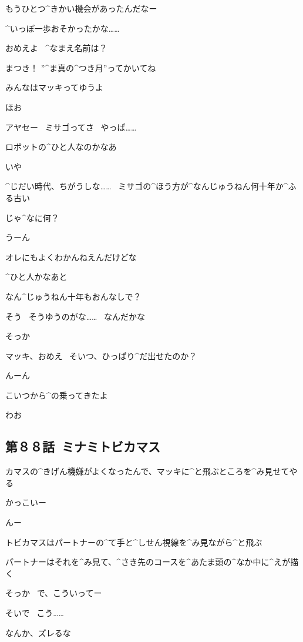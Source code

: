 \Ayase もうひとつ^{きかい}{機会}があったんだなー

\Ayase ^{いっぽ}{一歩}おそかったかな……

\page
\Ayase おめえよ
\ ^{なまえ}{名前}は？

\Makki まつき！
”^{ま}{真}の^{つき}{月}”ってかいてね

\Makki みんなはマッキってゆうよ

\Ayase ほお

\Makki アヤセー
\ ミサゴってさ
\ やっぱ……

\Makki ロボットの^{ひと}{人}なのかなあ

\Ayase いや

\Ayase ^{じだい}{時代}、ちがうしな……
\ ミサゴの^{ほう}{方}が^{なんじゅうねん}{何十年}か^{ふる}{古}い

\page
\Makki じゃ^{なに}{何}？

\Ayase うーん

\Ayase オレにもよくわかんねえんだけどな

\Ayase ^{ひと}{人}かなあと

\Makki なん^{じゅうねん}{十年}もおんなしで？

\Ayase そう
\ そうゆうのがな……
\ なんだかな

\Makki そっか

\page
\Ayase マッキ、おめえ
\ そいつ、ひっぱり^{だ}{出}せたのか？

\Makki んーん

\Makki こいつから^{の}{乗}ってきたよ

\page
\Makki わお


\subsection{第８８話\ ミナミトビカマス}

\page[154]
\Ayase カマスの^{きげん}{機嫌}がよくなったんで、マッキに^{と}{飛}ぶところを^{み}{見}せてやる

\Makki かっこいー

\Ayase んー

\page
\Ayase トビカマスはパートナーの^{て}{手}と^{しせん}{視線}を^{み}{見}ながら^{と}{飛}ぶ

\Ayase パートナーはそれを^{み}{見}て、^{さき}{先}のコースを^{あたま}{頭}の^{なか}{中}に^{えが}{描}く

\Makki そっか
\ で、こういってー

\Ayase そいで
\ こう……

\Ayase なんか、ズレるな

